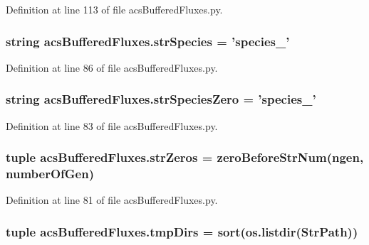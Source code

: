 Definition at line 113 of file acs\-Buffered\-Fluxes.\-py.

\hypertarget{a00098_a36518d8de93502466a6d4b2e62eb7734}{
\subsubsection[{str\-Species}]{\setlength{\rightskip}{0pt plus 5cm}string acs\-Buffered\-Fluxes.\-str\-Species = 'species\-\_\-'}}\label{a00098_a36518d8de93502466a6d4b2e62eb7734}


Definition at line 86 of file acs\-Buffered\-Fluxes.\-py.

\hypertarget{a00098_a658920d97b6df23e672e290d362033b4}{
\subsubsection[{str\-Species\-Zero}]{\setlength{\rightskip}{0pt plus 5cm}string acs\-Buffered\-Fluxes.\-str\-Species\-Zero = 'species\-\_\-'}}\label{a00098_a658920d97b6df23e672e290d362033b4}


Definition at line 83 of file acs\-Buffered\-Fluxes.\-py.

\hypertarget{a00098_abfa8fbc48a0ad5b6dff6914d6052b2b6}{
\subsubsection[{str\-Zeros}]{\setlength{\rightskip}{0pt plus 5cm}tuple acs\-Buffered\-Fluxes.\-str\-Zeros = {\bf zero\-Before\-Str\-Num}(ngen, {\bf number\-Of\-Gen})}}\label{a00098_abfa8fbc48a0ad5b6dff6914d6052b2b6}


Definition at line 81 of file acs\-Buffered\-Fluxes.\-py.

\hypertarget{a00098_af740eb0100dc7010628161baeaf9b474}{
\subsubsection[{tmp\-Dirs}]{\setlength{\rightskip}{0pt plus 5cm}tuple acs\-Buffered\-Fluxes.\-tmp\-Dirs = sort(os.\-listdir(Str\-Path))}}\label{a00098_af740eb0100dc7010628161baeaf9b474}


